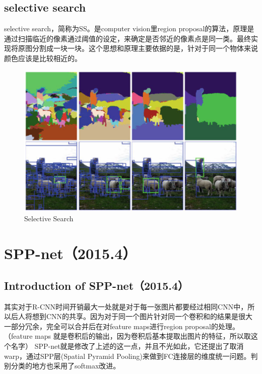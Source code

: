 \documentclass[a4paper,12pt]{report}
\begin{document}
\begin{spacing}{1.5}
\subsection{selective search}
selective search，简称为SS。是computer vision里region proposal的算法，原理是通过扫描临近的像素通过阈值的设定，来确定是否邻近的像素点是同一类。最终实现将原图分割成一块一块。这个思想和原理主要依据的是，针对于同一个物体来说颜色应该是比较相近的。

\begin{figure}[!h]
	\begin{center}
		\includegraphics[width=0.92\linewidth]{figure//selectiveSearch.png}
		\caption{Selective Search }
		\label{Fig:2}
	\end{center}
\end{figure}


\section{SPP-net（2015.4）}

\subsection{Introduction of SPP-net（2015.4）}

其实对于R-CNN时间开销最大一处就是对于每一张图片都要经过相同CNN中，所以后人将想到CNN的共享。因为对于同一个图片针对同一个卷积和的结果是很大一部分冗余，完全可以合并后在对feature maps进行region proposal的处理。（feature maps 就是卷积后的输出，因为卷积后基本提取出图片的特征，所以取这个名字）
SPP-net就是修改了上述的这一点，并且不光如此，它还提出了取消warp，通过SPP层(Spatial Pyramid Pooling)来做到FC连接层的维度统一问题。判别分类的地方也采用了softmax改进。\\


\end{spacing}
\end{document}
